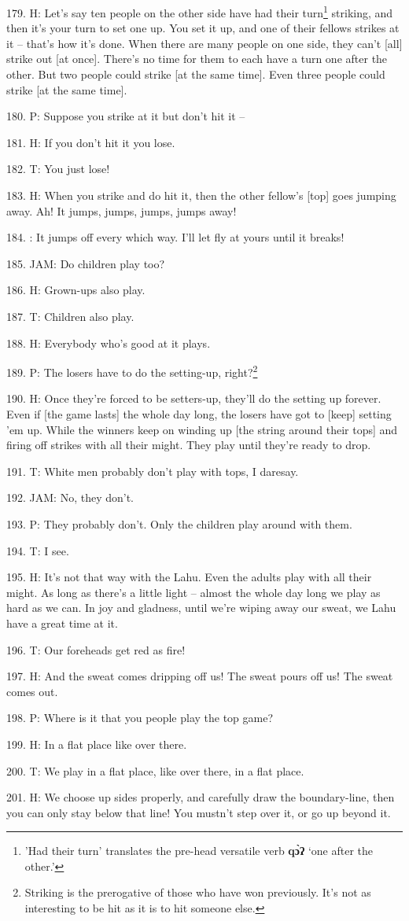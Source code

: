 179. H: Let's say ten people on the other side have had their turn\footnote{'Had their turn' translates the pre-head versatile verb \textbf{qɔ̀ʔ} `one after the other.'} striking,
and then it's your turn to set one up. You set it up, and one of their fellows
strikes at it -- that's how it's done. When there are many people on one side,
they can't [all] strike out [at once]. There's no time for them to each have a
turn one after the other. But two people could strike [at the same time]. Even
three people could strike [at the same time].

180. P: Suppose you strike at it but don't hit it --

181. H: If you don't hit it you lose.

182. T: You just lose!

183. H: When you strike and do hit it, then the other fellow's [top] goes jumping
away. Ah! It jumps, jumps, jumps, jumps away!

184. : It jumps off every which way. I'll let fly at yours until it breaks!

185. JAM: Do children play too?

186. H: Grown-ups also play.

187. T: Children also play.

188. H: Everybody who's good at it plays.

189. P: The losers have to do the setting-up, right?\footnote{Striking is the prerogative of those who have won previously. It's not as interesting to be hit as it is to hit someone else.}

190. H: Once they're forced to be setters-up, they'll do the setting up forever.
Even if [the game lasts] the whole day long, the losers have got to [keep] setting
'em up. While the winners keep on winding up [the string around their tops] and
firing off strikes with all their might. They play until they're ready to drop.

191. T: White men probably don't play with tops, I daresay.

192. JAM: No, they don't.

193. P: They probably don't. Only the children play around with them.

194. T: I see.

195. H: It's not that way with the Lahu. Even the adults play with all their might.
As long as there's a little light -- almost the whole day long we play as hard
as we can. In joy and gladness, until we're wiping away our sweat, we Lahu have
a great time at it.

196. T: Our foreheads get red as fire!

197. H: And the sweat comes dripping off us! The sweat pours off us! The sweat comes
out.

198. P: Where is it that you people play the top game?

199. H: In a flat place like over there.

200. T: We play in a flat place, like over there, in a flat place.

201. H: We choose up sides properly, and carefully draw the boundary-line, then
you can only stay below that line! You mustn't step over it, or go up beyond it.

